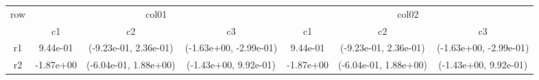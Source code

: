 \begin{tabular}{ccccccc}
\toprule
\multirow{2}{*}{row}&\multicolumn{3}{c}{col01}&\multicolumn{3}{c}{col02}\tabularnewline
\cmidrule(lr){2-4}
\cmidrule(lr){5-7}
&c1&c2&c3&c1&c2&c3\tabularnewline
\midrule
r1&9.44e-01& (-9.23e-01, 2.36e-01)& (-1.63e+00, -2.99e-01)&9.44e-01& (-9.23e-01, 2.36e-01)& (-1.63e+00, -2.99e-01)\tabularnewline
r2&-1.87e+00& (-6.04e-01, 1.88e+00)& (-1.43e+00, 9.92e-01)&-1.87e+00& (-6.04e-01, 1.88e+00)& (-1.43e+00, 9.92e-01)\tabularnewline
\bottomrule
\end{tabular}
